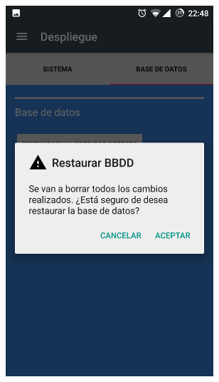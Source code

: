 \documentclass[../PFC.tex]{subfiles}
\begin{document}
\begin{figure}[H]
\centering
	\begin{subfigure}{0.4\textwidth}
		\centering
		\includegraphics[width=0.85\textwidth]{./img/app/despliegueBaseDeDatosDialog}
    \end{subfigure}          
    \qquad\qquad\qquad  %
    \begin{subfigure}{0.4\textwidth}  
       \centering

\end{subfigure}
\end{figure}
\end{document}
